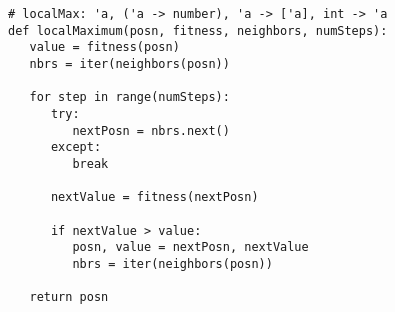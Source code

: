 \begin{lstlisting}[caption={A simple gradient ascent
algorithm},label=listing:gradient-ascent]
# localMax: 'a, ('a -> number), 'a -> ['a], int -> 'a                                       
def localMaximum(posn, fitness, neighbors, numSteps):
   value = fitness(posn)
   nbrs = iter(neighbors(posn))

   for step in range(numSteps):
      try:
         nextPosn = nbrs.next()
      except:
         break

      nextValue = fitness(nextPosn)

      if nextValue > value:
         posn, value = nextPosn, nextValue
         nbrs = iter(neighbors(posn))

   return posn
\end{lstlisting}
